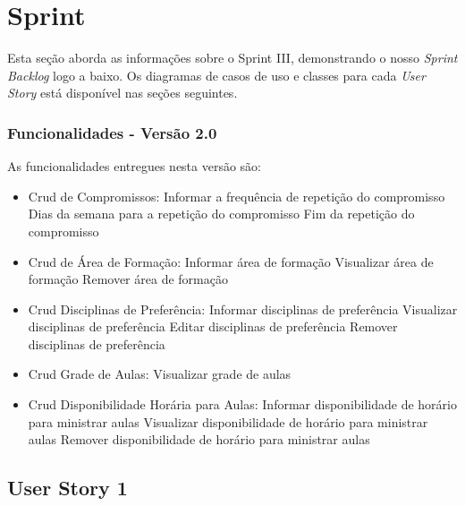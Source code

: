 \documentclass{abnt}
\begin{document}
		


\clearpage

\chapter{Sprint}
	
		Esta seção aborda as informações sobre o Sprint III, demonstrando o nosso \emph{Sprint Backlog} logo a baixo. Os diagramas de casos de uso e classes para cada \emph{User Story} está disponível nas seções seguintes.
	
			
		\subsection{Funcionalidades - Versão 2.0}
		
			As funcionalidades entregues nesta versão são:
		
			\begin{itemize} 
			\item Crud de Compromissos:
			\subitem Informar a frequência de repetição do compromisso
			\subitem Dias da semana para a repetição do compromisso
			\subitem Fim da repetição do compromisso
			
			\item Crud de Área de Formação:
			\subitem Informar área de formação
			\subitem Visualizar área de formação
			\subitem Remover área de formação
			
			\item Crud Disciplinas de Preferência:
			\subitem Informar disciplinas de preferência
			\subitem Visualizar disciplinas de preferência
			\subitem Editar disciplinas de preferência
			\subitem Remover disciplinas de preferência
			
			\item Crud Grade de Aulas:
			\subitem Visualizar grade de aulas
			
			\item Crud Disponibilidade Horária para Aulas:
			\subitem Informar disponibilidade de horário para ministrar aulas
			\subitem Visualizar disponibilidade de horário para ministrar aulas
			\subitem Remover disponibilidade de horário para ministrar aulas
			
			\end{itemize}
			
	\clearpage
	\section{User Story 1}
	
\end{document}
